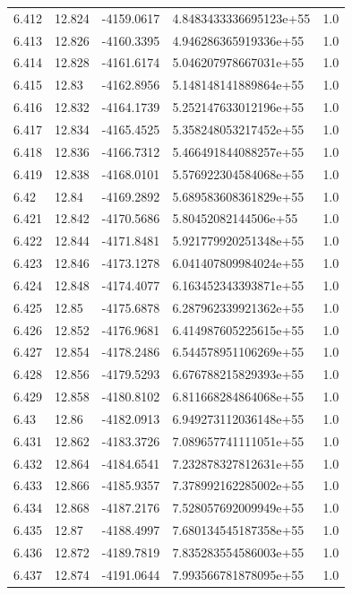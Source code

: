 \begin{tabular}{lllll}
6.412 & 12.824 & -4159.0617 & 4.8483433336695123e+55 & 1.0 \\
6.413 & 12.826 & -4160.3395 & 4.946286365919336e+55 & 1.0 \\
6.414 & 12.828 & -4161.6174 & 5.046207978667031e+55 & 1.0 \\
6.415 & 12.83 & -4162.8956 & 5.148148141889864e+55 & 1.0 \\
6.416 & 12.832 & -4164.1739 & 5.252147633012196e+55 & 1.0 \\
6.417 & 12.834 & -4165.4525 & 5.358248053217452e+55 & 1.0 \\
6.418 & 12.836 & -4166.7312 & 5.466491844088257e+55 & 1.0 \\
6.419 & 12.838 & -4168.0101 & 5.576922304584068e+55 & 1.0 \\
6.42 & 12.84 & -4169.2892 & 5.689583608361829e+55 & 1.0 \\
6.421 & 12.842 & -4170.5686 & 5.80452082144506e+55 & 1.0 \\
6.422 & 12.844 & -4171.8481 & 5.921779920251348e+55 & 1.0 \\
6.423 & 12.846 & -4173.1278 & 6.041407809984024e+55 & 1.0 \\
6.424 & 12.848 & -4174.4077 & 6.163452343393871e+55 & 1.0 \\
6.425 & 12.85 & -4175.6878 & 6.287962339921362e+55 & 1.0 \\
6.426 & 12.852 & -4176.9681 & 6.414987605225615e+55 & 1.0 \\
6.427 & 12.854 & -4178.2486 & 6.544578951106269e+55 & 1.0 \\
6.428 & 12.856 & -4179.5293 & 6.676788215829393e+55 & 1.0 \\
6.429 & 12.858 & -4180.8102 & 6.811668284864068e+55 & 1.0 \\
6.43 & 12.86 & -4182.0913 & 6.949273112036148e+55 & 1.0 \\
6.431 & 12.862 & -4183.3726 & 7.089657741111051e+55 & 1.0 \\
6.432 & 12.864 & -4184.6541 & 7.232878327812631e+55 & 1.0 \\
6.433 & 12.866 & -4185.9357 & 7.378992162285002e+55 & 1.0 \\
6.434 & 12.868 & -4187.2176 & 7.528057692009949e+55 & 1.0 \\
6.435 & 12.87 & -4188.4997 & 7.680134545187358e+55 & 1.0 \\
6.436 & 12.872 & -4189.7819 & 7.835283554586003e+55 & 1.0 \\
6.437 & 12.874 & -4191.0644 & 7.993566781878095e+55 & 1.0 \\

\end{tabular}

